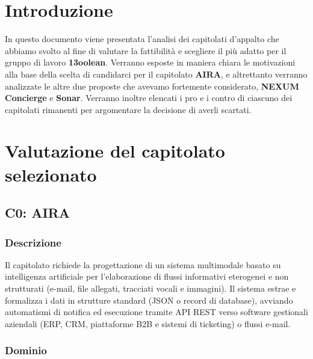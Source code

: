 \section{Introduzione}
In questo documento viene presentata l'analisi dei capitolati d'appalto che abbiamo svolto al fine di valutare la fattibilità e scegliere il più adatto per il gruppo di lavoro \textbf{13oolean}. Verranno esposte in maniera chiara le motivazioni alla base della scelta di candidarci per il capitolato \textbf{AIRA}, e altrettanto verranno analizzate le altre due proposte che avevamo fortemente considerato, \textbf{NEXUM Concierge} e \textbf{Sonar}. Verranno inoltre elencati i pro e i contro di ciascuno dei capitolati rimanenti per argomentare la decisione di averli scartati.

\section{Valutazione del capitolato selezionato}
\subsection{C0: AIRA}

\subsubsection{Descrizione}
Il capitolato richiede la progettazione di un sistema multimodale basato su intelligenza artificiale per l'elaborazione di flussi informativi eterogenei e non strutturati (e-mail, file allegati, tracciati vocali e immagini). Il sistema estrae e formalizza i dati in strutture standard (JSON o record di database), avviando automatismi di notifica ed esecuzione tramite API REST verso software gestionali aziendali (ERP, CRM, piattaforme B2B e sistemi di ticketing) o flussi e-mail.

\subsubsection{Dominio}

